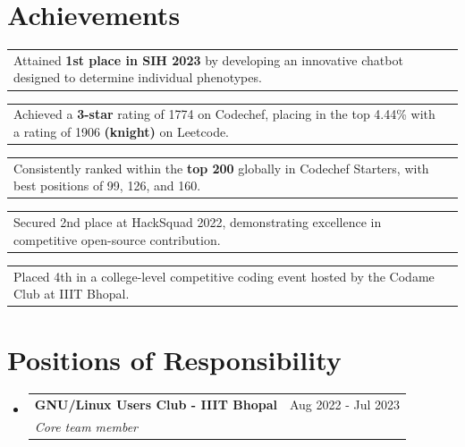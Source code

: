 \documentclass[a4paper,20pt]{article}
\makeatletter
\newcommand{\resumeSubheading}[4]{
  \vspace{-1pt}\item
    \begin{tabular*}{0.97\textwidth}{l@{\extracolsep{\fill}}r}
      \textbf{#1} & #2 \\
      \textit{#3} & \textit{#4} \\
    \end{tabular*}\vspace{-5pt}
}
\newcommand{\resumeSmallSubheading}[2]{
  \vspace{-1pt}\item
    \begin{tabular*}{0.97\textwidth}{l@{\extracolsep{\fill}}r}
      #1 & #2 \\
    \end{tabular*}\vspace{-5pt}
}
\newcommand{\resumeSubHeadingListStart}{\begin{itemize}[label={}, leftmargin=*]}
\newcommand{\resumeSubHeadingListEnd}{\end{itemize}}
\makeatother
\begin{document}
\section{Achievements}
\begin{description}[font=$\bullet$]
  \resumeSmallSubheading{Attained \textbf{1st place in SIH 2023} by developing an innovative chatbot designed to determine individual phenotypes.}{}
  \vspace{-10pt}
  \resumeSmallSubheading{Achieved a \textbf{3-star} rating of 1774 on Codechef, placing in the top 4.44\% with a rating of 1906 \textbf{(knight)} on Leetcode.}{}
  \vspace{-10pt}
  \resumeSmallSubheading{Consistently ranked within the \textbf{top 200} globally in Codechef Starters, with best positions of 99, 126, and 160.}{}
  \vspace{-10pt}
  \resumeSmallSubheading{Secured 2nd place at HackSquad 2022, demonstrating excellence in competitive open-source contribution.} {}
  \vspace{-10pt}
  \resumeSmallSubheading{Placed 4th in a college-level competitive coding event hosted by the Codame Club at IIIT Bhopal.}{}
  \vspace{-10pt}
\end{description}

\vspace{-2pt}
\section{Positions of Responsibility}
\resumeSubHeadingListStart
    \resumeSubheading
    {GNU/Linux Users Club - IIIT Bhopal}{Aug 2022 - Jul 2023}
    {Core team member}{}

\resumeSubHeadingListEnd
\end{document}

